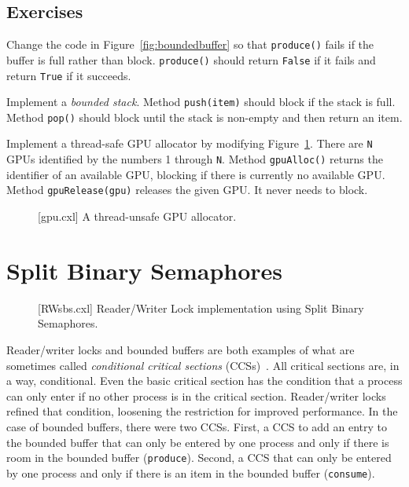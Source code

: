 \documentclass{report}
\newenvironment{code}{
\tcolorbox
}{
\endtcolorbox
}
\begin{document}
\section*{Exercises}
\begin{problems}
\item Change the code in Figure~\ref{fig:boundedbuffer} so that
\texttt{produce()} fails if the buffer is full rather than block.
\texttt{produce()} should return \texttt{False} if it fails
and return \texttt{True} if it succeeds.
\item Implement a \emph{bounded stack}.  Method \texttt{push(item)}
should block if the stack is full.  Method \texttt{pop()} should block
until the stack is non-empty and then return an item.
\item \label{ex:gpu} Implement a thread-safe GPU allocator by modifying
Figure~\ref{fig:gpu}.
There are \texttt{N} GPUs identified by the numbers
1 through \texttt{N}.  Method \texttt{gpuAlloc()} returns the identifier
of an available GPU, blocking if there is currently no available GPU.
Method \texttt{gpuRelease(gpu)} releases the given GPU.  It never needs
to block.
\end{problems}

\begin{figure}
\begin{code}
\end{code}
\caption{[gpu.cxl] A thread-unsafe GPU allocator.}
\label{fig:gpu}
\end{figure}

\chapter{Split Binary Semaphores}
\label{ch:sbs}

\begin{figure}
\begin{code}
\end{code}
\caption{[RWsbs.cxl] Reader/Writer Lock implementation using Split Binary Semaphores.}
\label{fig:RWsplitsema}
\end{figure}

Reader/writer locks and bounded buffers are both examples of what are
sometimes called \emph{conditional critical sections}
(CCSs)~\cite{Hoare73}.
All critical sections are, in a way, conditional.  Even the basic critical section
has the condition that a process can only enter if no other process
is in the critical section.  Reader/writer locks refined that condition, loosening
the restriction for improved performance.
In the case of bounded buffers, there were two CCSs.  First, a CCS
to add an entry to the bounded buffer that can only be entered by one
process and only if there is room in the bounded buffer (\texttt{produce}).
Second, a CCS that can only be entered by one process and
only if there is an item in the bounded buffer (\texttt{consume}).
\end{document}
